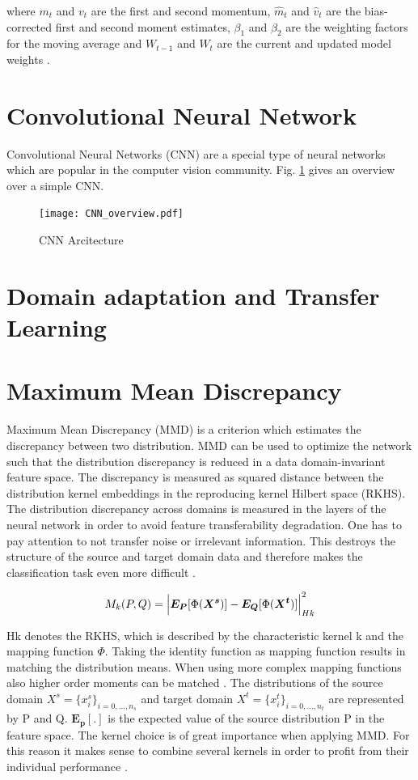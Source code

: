 where $m_{t}$ and $v_{t}$ are the first and second momentum, $\hat{m}_{t}$ and $\hat{v}_{t}$ are the bias-corrected first and second moment estimates, $\beta_{1}$ and $\beta_{2}$ are the weighting factors for the moving average and $W_{t-1}$ and  $W_{t}$ are the current and updated model weights \cite{Ruder2016}.



\section{Convolutional Neural Network}
Convolutional Neural Networks (CNN) are a special type of neural networks which are popular in the computer vision community. Fig. \ref{fig:CNN_overview} gives an overview over a simple CNN.
\begin{figure}[htpb]
  \centering
  \texttt{[image: CNN\_overview.pdf]}
  \caption {CNN Arcitecture}
  \label{fig:CNN_overview}
\end{figure}


\section{Domain adaptation and Transfer Learning}

\section{Maximum Mean Discrepancy}
Maximum Mean Discrepancy (MMD) is a criterion which estimates the discrepancy between two distribution. MMD can be used to optimize the network such that the distribution discrepancy is reduced in a data domain-invariant feature space. The discrepancy is measured as squared distance between the distribution kernel embeddings in the reproducing kernel Hilbert space (RKHS). The distribution discrepancy across domains is measured in the layers of the neural network in order to avoid feature transferability degradation. One has to pay attention to not transfer noise or irrelevant information. This destroys the structure of the source and target domain data and therefore makes the classification task even more difficult \cite{li2020domain}. 

\begin{align}
    M_{k}(P,Q) = \Bigl|  \boldsymbol{E_{P}}[\Phi(\boldsymbol{X^{s}})] - \boldsymbol{E_{Q}}[\Phi(\boldsymbol{X^{t}})]     \Bigl|^{2}_{Hk}
\end{align}

Hk denotes the RKHS, which is described by the characteristic kernel k and the mapping function $\Phi$. Taking the identity function as mapping function results in matching the distribution means. When using more complex mapping functions also higher order moments can be matched \cite{Yujia2015}. The distributions of the source domain $X^{s} = \{{x}_{i}^{s}\}_{i=0,...,n_{s}}$ and target domain $X^{t} = \{{x}_{i}^{t}\}_{i=0,...,n_{t}}$ are represented by P and Q. $\boldsymbol{E_{p}[.]}$ is the expected value of the source distribution P in the feature space. The kernel choice is of great importance when applying MMD. For this reason it makes sense to combine several kernels in order to profit from their individual performance \cite{li2020domain}.

